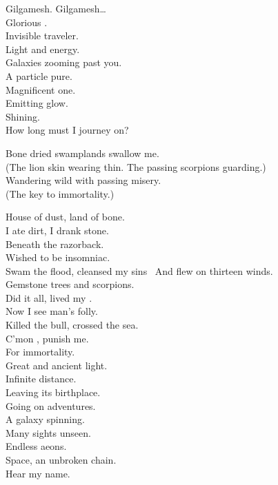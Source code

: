Gilgamesh. Gilgamesh… \\

Glorious . \\
Invisible traveler. \\
Light and energy. \\
Galaxies zooming past you. \\
A particle pure. \\
Magnificent one. \\
Emitting glow. \\
Shining. \\
How long must I journey on? \\


Bone dried swamplands swallow me. \\
(The lion skin wearing thin. The passing scorpions guarding.) \\
Wandering wild with passing misery. \\
(The key to immortality.) \\


House of dust, land of bone. \\
I ate dirt, I drank stone. \\
Beneath the razorback. \\
Wished to be insomniac. \\
Swam the flood, cleansed my sins \
And flew on thirteen winds. \\
Gemstone trees and scorpions. \\
Did it all, lived my . \\
Now I see man's folly. \\
Killed the bull, crossed the sea. \\
C'mon , punish me. \\
For immortality. \\

Great and ancient light. \\
Infinite distance. \\
Leaving its birthplace. \\
Going on adventures. \\
A galaxy spinning. \\
Many sights unseen. \\
Endless aeons. \\
Space, an unbroken chain. \\
Hear my name. \\

